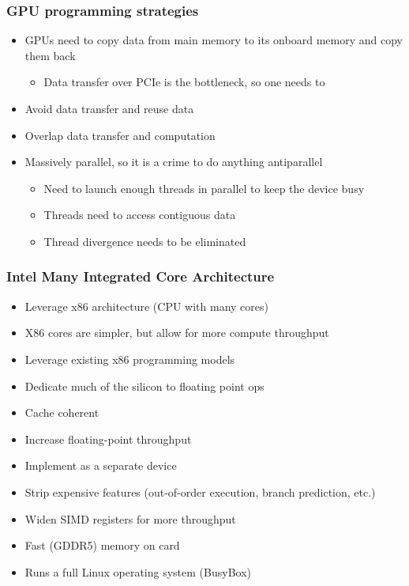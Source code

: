 \documentclass[10pt,t]{beamer}
\begin{document}
\begin{frame}
\frametitle{GPU programming strategies}
\begin{itemize}
\item GPUs need to copy data from main memory to its onboard
memory and copy them back
\begin{itemize}
\item Data transfer over PCIe is the bottleneck, so one needs to
\end{itemize}
\item Avoid data transfer and reuse data
\item Overlap data transfer and computation
\item Massively parallel, so it is a crime to do anything antiparallel
\begin{itemize}
\item Need to launch enough threads in parallel to keep the
device busy
\item Threads need to access contiguous data
\item Thread divergence needs to be eliminated
\end{itemize}
\end{itemize}
\end{frame}

\begin{frame}
\frametitle{Intel Many Integrated Core Architecture}
\begin{itemize}
\item Leverage x86 architecture (CPU with many cores)
\item[] X86 cores are simpler, but allow for more compute throughput
\item Leverage existing x86 programming models
\item Dedicate much of the silicon to floating point ops
\item Cache coherent
\item Increase floating-point throughput
\item Implement as a separate device
\item Strip expensive features (out-of-order execution, branch prediction,
etc.)
\item Widen SIMD registers for more throughput
\item Fast (GDDR5) memory on card
\item Runs a full Linux operating system (BusyBox)
\end{itemize}
\end{frame}
\end{document}

